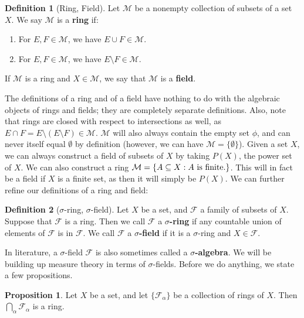 \documentclass[11pt, oneside]{amsart}   	%
\theoremstyle{definition}
\newtheorem{definition}{Definition}[section]
\newtheorem{prop}{Proposition}[section]
\begin{document}
	\begin{definition}[Ring, Field]
		Let $\mathcal M$ be a nonempty collection of subsets of a set $X$. We say $\mathcal M$ is a \textbf{ring} if:
		\begin{enumerate}
			\item For $E, F\in\mathcal M$, we have $E\cup F\in\mathcal M$.
			\item For $E, F\in\mathcal M$, we have $E\setminus F\in\mathcal M$.
		\end{enumerate}
		If $\mathcal M$ is a ring and $X\in\mathcal M$, we say that $\mathcal M$ is a \textbf{field}.
	\end{definition}
	
	The definitions of a ring and of a field have nothing to do with the algebraic objects of rings and fields; they are completely 
	separate definitions. Also, note that rings are closed with respect to intersections as well, as $E\cap F = E\setminus(E
	\setminus F)\in\mathcal M$. $\mathcal M$ will also always contain the empty set $\phi$, and can never itself equal 
	$\emptyset$ by definition (however, we can have $\mathcal M = \{\emptyset\}$). Given a set $X$, we can always 
	construct a field of subsets of $X$ by taking $P(X)$, the power set of $X$. We can also construct a ring $\mathcal M = 
	\{A\subseteq X : A \textnormal{ is finite.}\}$. This will in fact be a field if $X$ is a finite set, as then it will simply be $P(X)$. 
	We can further refine our definitions of a ring and field:
	
	\begin{definition}[$\sigma$-ring, $\sigma$-field]
		Let $X$ be a set, and $\mathcal F$ a family of subsets of $X$. Suppose that $\mathcal F$ is a ring. Then we call 
		$\mathcal F$ a \textbf{$\sigma$-ring} if any countable union of elements of $\mathcal F$ is in $\mathcal F$. We call 
		$\mathcal F$ a \textbf{$\sigma$-field} if it is a $\sigma$-ring and $X\in\mathcal F$.
	\end{definition}
	
	In literature, a $\sigma$-field $\mathcal F$ is also sometimes called a \textbf{$\sigma$-algebra}. We will be building up 
	measure theory in terms of $\sigma$-fields. Before we do anything, we state a few propositions.
	
	\begin{prop}
		Let $X$ be a set, and let $\{\mathcal F_\alpha\}$ be a collection of rings of $X$. Then $\bigcap_\alpha\mathcal 
		F_\alpha$ is a ring.
	\end{prop}
	
\end{document}
